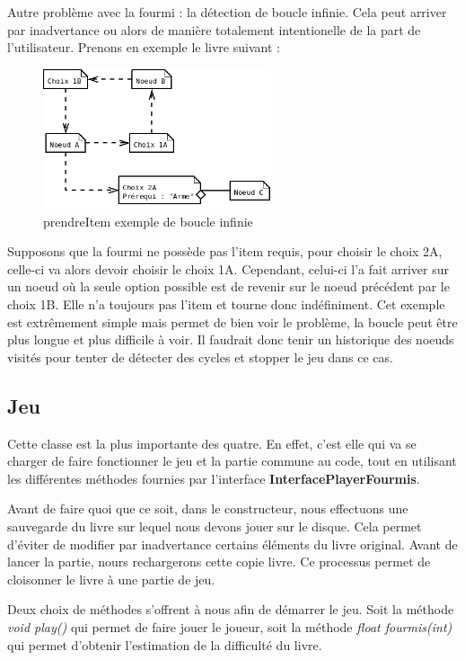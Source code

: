 			Autre problème avec la fourmi : la détection de boucle infinie. Cela peut arriver par inadvertance ou alors de manière totalement intentionelle de la part de l'utilisateur. Prenons en exemple le livre suivant :

			\begin{figure}[H]
				\centering\includegraphics[width=0.6\textwidth, keepaspectratio]{img/fourmisPrendreItemInfiniExemple.png}
				\caption{prendreItem exemple de boucle infinie}
			\end{figure}

			 Supposons que la fourmi ne possède pas l'item requis, pour choisir le choix 2A, celle-ci va alors devoir choisir le choix 1A. Cependant, celui-ci l'a fait arriver sur un noeud où la seule option possible est de revenir sur le noeud précédent par le choix 1B. Elle n'a toujours pas l'item et tourne donc indéfiniment. Cet exemple est extrêmement simple mais permet de bien voir le problème, la boucle peut être plus longue et plus difficile à voir. Il faudrait donc tenir un historique des noeuds visités pour tenter de détecter des cycles et stopper le jeu dans ce cas.

		\subsection{Jeu}

			Cette classe est la plus importante des quatre. En effet, c'est elle qui va se charger de faire fonctionner le jeu et la partie commune au code, tout en utilisant les différentes méthodes fournies par l'interface \textbf{InterfacePlayerFourmis}.

			Avant de faire quoi que ce soit, dans le constructeur, nous effectuons une sauvegarde du livre sur lequel nous devons jouer sur le disque. Cela permet d'éviter de modifier par inadvertance certains éléments du livre original. Avant de lancer la partie, nours rechargerons cette copie livre. Ce processus permet de cloisonner le livre à une partie de jeu.

			Deux choix de méthodes s'offrent à nous afin de démarrer le jeu. Soit la méthode \textit{void play()} qui permet de faire jouer le joueur, soit la méthode \textit{float fourmis(int)} qui permet d'obtenir l'estimation de la difficulté du livre.

